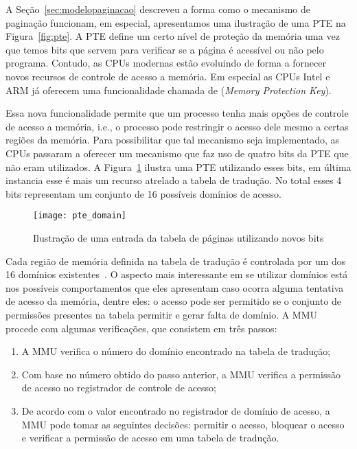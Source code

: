A Seção~\ref{sec:modelopaginacao} descreveu a forma como o mecanismo de
paginação funcionam, em especial, apresentamos uma ilustração de uma PTE na
Figura~\ref{fig:pte}. A PTE define um certo nível de proteção da memória uma
vez que temos bits que servem para verificar se a página é acessível ou não
pelo programa. Contudo, as CPUs modernas estão evoluindo de forma a fornecer
novos recursos de controle de acesso a memória. Em especial as CPUs Intel e ARM
já oferecem uma funcionalidade chamada de  (\emph{Memory Protection Key}).

Essa nova funcionalidade permite que um processo tenha mais opções de controle
de acesso a memória, i.e., o processo pode restringir o acesso dele mesmo a
certas regiões da memória. Para possibilitar que tal mecanismo seja
implementado, as CPUs passaram a oferecer um mecanismo que faz uso de quatro
bits da PTE que não eram utilizados. A Figura~\ref{fig:ptedominio} ilustra uma
PTE utilizando esses bits, em última instancia esse é mais um recurso atrelado
a tabela de tradução. No total esses 4 bits representam um conjunto de 16
possíveis domínios de acesso. 

\begin{figure}[!h]
  \centering
  \texttt{[image: pte\_domain]} 
  \caption{Ilustração de uma entrada da tabela de páginas utilizando novos bits}
  \label{fig:ptedominio} 
\end{figure}

Cada região de memória definida na tabela de tradução é controlada por um dos
16 domínios existentes~\citep{armdeveloperguide}.  O aspecto mais interessante
em se utilizar domínios está nos possíveis comportamentos que eles apresentam
caso ocorra alguma tentativa de acesso da memória, dentre eles: o acesso pode
ser permitido se o conjunto de permissões presentes na tabela permitir e gerar
falta de domínio. A MMU procede com algumas verificações, que consistem em três
passos:

\begin{enumerate}
  \item A MMU verifica o número do domínio encontrado na tabela de tradução;
  \item Com base no número obtido do passo anterior, a MMU verifica a permissão
        de acesso no registrador de controle de acesso;
  \item De acordo com o valor encontrado no registrador de domínio de acesso, a
        MMU pode tomar as seguintes decisões: permitir o acesso, bloquear o
        acesso e verificar a permissão de acesso em uma tabela de tradução.
\end{enumerate}

